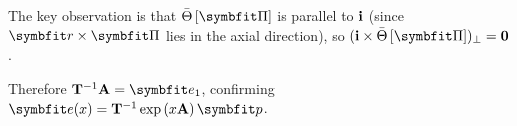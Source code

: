 \begin{Details}
The key observation is that $\RotationAverage{\PlaneShape}$ is parallel to 
$\mathbf{i}$ (since $\bm{r} \times \PlaneShape$ lies in the axial direction), 
so $(\FrameBasis \times \RotationAverage{\PlaneShape})_\perp = \mathbf{0}$.

Therefore $\TraceDeDpRoot\mathbf{A} = \bm{e}_1$, confirming 
$\bm{e}(x) = \TraceDeDpRoot \exp\left(x\mathbf{A}\right)\bm{p}$.
\end{Details}

